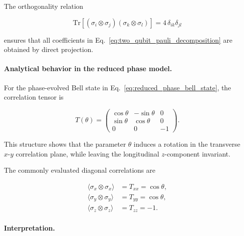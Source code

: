 \medskip

The orthogonality relation

\begin{equation}
\mathrm{Tr}
\left[
(\sigma_i \otimes \sigma_j)
(\sigma_k \otimes \sigma_l)
\right]
=
4\,\delta_{ik}\delta_{jl}
\label{eq:pauli_tensor_orthogonality}
\end{equation}

ensures that all coefficients in Eq.~\eqref{eq:two_qubit_pauli_decomposition} are obtained by direct projection.

\medskip

\paragraph{Analytical behavior in the reduced phase model.}

For the phase-evolved Bell state in Eq.~\eqref{eq:reduced_phase_bell_state}, the correlation tensor is

\begin{equation}
T(\theta)
=
\begin{pmatrix}
\cos\theta & -\sin\theta & 0\\
\sin\theta & \cos\theta & 0\\
0 & 0 & -1
\end{pmatrix}.
\label{eq:correlation_tensor_phase_model}
\end{equation}

This structure shows that the parameter \( \theta \) induces a rotation in the transverse \( x\text{-}y \) correlation plane, while leaving the longitudinal \( z \)-component invariant.

\medskip

The commonly evaluated diagonal correlations are

\begin{align}
\langle \sigma_x \otimes \sigma_x \rangle
&=
T_{xx}
=
\cos\theta,
\nonumber
\\
\langle \sigma_y \otimes \sigma_y \rangle
&=
T_{yy}
=
\cos\theta,
\nonumber
\\
\langle \sigma_z \otimes \sigma_z \rangle
&=
T_{zz}
=
-1.
\label{eq:phase_model_diagonal_correlations}
\end{align}

\medskip

\paragraph{Interpretation.}

